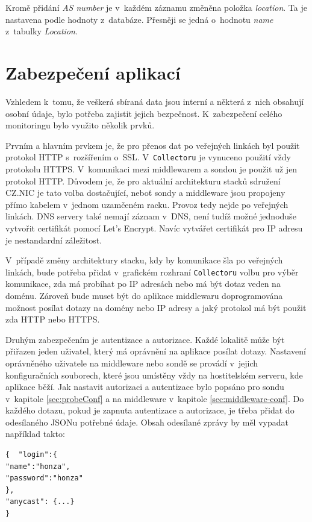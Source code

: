 \documentclass[thesis=M,czech]{src/FITthesis}[2019/12/23]
\begin{document}
Kromě přidání \textit{AS number} je v~každém záznamu změněna položka \textit{location}. Ta je nastavena  podle hodnoty z~databáze. Přesněji se jedná o~hodnotu \textit{name} z~tabulky \textit{Location}.

\section{Zabezpečení aplikací}
\label{sec:security}
Vzhledem k~tomu, že veškerá sbíraná data jsou interní a některá z~nich obsahují osobní údaje, bylo potřeba zajistit jejich bezpečnost. K~zabezpečení celého monitoringu bylo využito několik prvků. 

Prvním a hlavním prvkem je, že pro přenos dat po veřejných linkách byl použit protokol HTTP s~rozšířením o~SSL. V~\texttt{Collectoru} je vynuceno použití vždy protokolu HTTPS. V~komunikaci mezi middlewarem a sondou je použit už jen protokol HTTP. Důvodem je, že pro aktuální architekturu stacků sdružení CZ.NIC je tato volba dostačující, neboť sondy a middleware jsou propojeny přímo kabelem v~jednom uzamčeném racku. Provoz tedy nejde po veřejných linkách. DNS servery také nemají záznam v~DNS, není tudíž možné jednoduše vytvořit certifikát pomocí Let's Encrypt. Navíc vytvářet certifikát pro IP adresu je nestandardní záležitost. 

V~případě změny architektury stacku, kdy by komunikace šla po veřejných linkách, bude potřeba přidat v~grafickém rozhraní \texttt{Collectoru} volbu pro výběr komunikace, zda má probíhat po IP adresách nebo má být dotaz veden na doménu. Zároveň bude muset být do aplikace middlewaru doprogramována možnost posílat dotazy na domény nebo IP adresy a jaký protokol má být použit zda HTTP nebo HTTPS.

Druhým zabezpečením je autentizace a autorizace. Každé lokalitě může být přiřazen jeden uživatel, který má oprávnění na aplikace posílat dotazy. Nastavení oprávněného uživatele na middleware nebo sondě se provádí v~jejich konfiguračních souborech, které jsou umístěny vždy na hostitelském serveru, kde aplikace běží. Jak nastavit autorizaci a autentizace bylo popsáno pro sondu v~kapitole \ref{sec:probeConf} a na middleware v~kapitole \ref{sec:middleware-conf}. Do každého dotazu, pokud je zapnuta autentizace a autorizace, je třeba přidat do odesílaného JSONu potřebné údaje. Obsah odesílané zprávy by měl vypadat například takto: 

\begin{verbatim}
{  "login":{
"name":"honza",
"password":"honza"
},
"anycast": {...}
}
\end{verbatim} 
\end{document}
